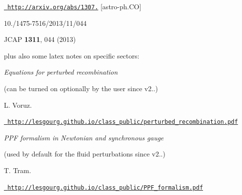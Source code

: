 \begin{DoxyItemize}
\begin{DoxyItemize}
\href{http://arxiv.org/abs/1307.1459}{\texttt{ http\+://arxiv.\+org/abs/1307.}} \mbox{[}astro-\/ph.\+CO\mbox{]}

10./1475-\/7516/2013/11/044

JCAP {\bfseries{1311}}, 044 (2013)
\end{DoxyItemize}

plus also some latex notes on specific sectors\+:
\begin{DoxyItemize}
\item {\itshape Equations for perturbed recombination}

(can be turned on optionally by the user since v2..)

L. Voruz.

\href{http://lesgourg.github.io/class_public/perturbed_recombination.pdf}{\texttt{ http\+://lesgourg.\+github.\+io/class\+\_\+public/perturbed\+\_\+recombination.\+pdf}}
\item {\itshape PPF formalism in Newtonian and synchronous gauge}

(used by default for the fluid perturbations since v2..)

T. Tram.

\href{http://lesgourg.github.io/class_public/PPF_formalism.pdf}{\texttt{ http\+://lesgourg.\+github.\+io/class\+\_\+public/\+PPF\+\_\+formalism.\+pdf}} 
\end{DoxyItemize}
\end{DoxyItemize}